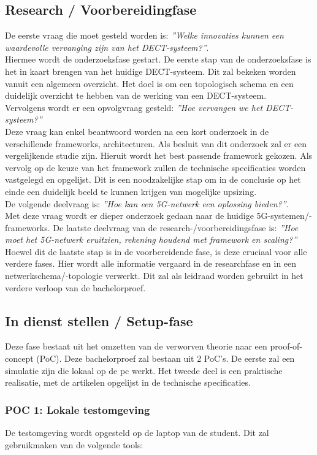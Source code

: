 \subsection{Research / Voorbereidingfase}
De eerste vraag die moet gesteld worden is: \textit{''Welke innovaties kunnen een waardevolle vervanging zijn van het DECT-systeem?''}.\\ 
Hiermee wordt de onderzoeksfase gestart. De eerste stap van de onderzoeksfase is het in kaart brengen van het huidige DECT-systeem. Dit zal bekeken worden vanuit een algemeen overzicht. Het doel is om een topologisch schema en een duidelijk overzicht te hebben van de werking van een DECT-systeem.\\
Vervolgens wordt er een opvolgvraag gesteld: \textit{''Hoe vervangen we het DECT-systeem?''}\\ Deze vraag kan enkel beantwoord worden na een kort onderzoek in de verschillende frameworks, architecturen. Als besluit van dit onderzoek zal er een vergelijkende studie zijn. Hieruit wordt het best passende framework gekozen.
Als vervolg op de keuze van het framework zullen de technische specificaties worden vastgelegd en opgelijst. Dit is een noodzakelijke stap om in de conclusie op het einde een duidelijk beeld te kunnen krijgen van mogelijke upsizing.\\
De volgende deelvraag is: \textit{''Hoe kan een 5G-netwerk een oplossing bieden?''}.\\ Met deze vraag wordt er dieper onderzoek gedaan naar de huidige 5G-systemen/-frameworks. De laatste deelvraag van de research-/voorbereidingsfase is: \textit{''Hoe moet het 5G-netwerk eruitzien, rekening houdend met framework en scaling?''}\\ Hoewel dit de laatste stap is in de voorbereidende fase, is deze cruciaal voor alle verdere fases. Hier wordt alle informatie vergaard in de researchfase en in een netwerkschema/-topologie verwerkt. Dit zal als leidraad worden gebruikt in het verdere verloop van de bachelorproef.
\subsection{In dienst stellen / Setup-fase}
Deze fase bestaat uit het omzetten van de verworven theorie naar een proof-of-concept (PoC). Deze bachelorproef zal bestaan uit 2 PoC's. De eerste zal een simulatie zijn die lokaal op de pc werkt. Het tweede deel is een praktische realisatie, met de artikelen opgelijst in de technische specificaties.

\subsubsection{POC 1: Lokale testomgeving}
De testomgeving wordt opgesteld op de laptop van de student. Dit zal gebruikmaken van de volgende tools:

